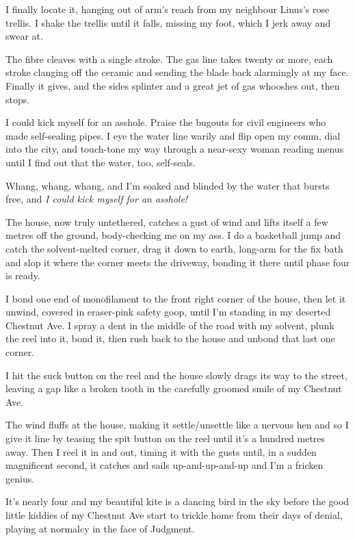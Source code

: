 I finally locate it, hanging out of arm's reach from my neighbour
Linus's rose trellis. I shake the trellis until it falls, missing
my foot, which I jerk away and swear at.

\tb

The fibre cleaves with a single stroke. The gas line takes twenty
or more, each stroke clanging off the ceramic and sending the blade
back alarmingly at my face. Finally it gives, and the sides
splinter and a great jet of gas whooshes out, then stops.

I could kick myself for an asshole. Praise the bugouts for civil
engineers who made self-sealing pipes. I eye the water line warily
and flip open my comm, dial into the city, and touch-tone my way
through a near-sexy woman reading menus until I find out that the
water, too, self-seals.

Whang, whang, whang, and I'm soaked and blinded by the water that
bursts free, and \emph{I could kick myself for an asshole!}

The house, now truly untethered, catches a gust of wind and lifts
itself a few metres off the ground, body-checking me on my ass. I
do a basketball jump and catch the solvent-melted corner, drag it
down to earth, long-arm for the fix bath and slop it where the
corner meets the driveway, bonding it there until phase four is
ready.

\tb

I bond one end of monofilament to the front right corner of the
house, then let it unwind, covered in eraser-pink safety goop,
until I'm standing in my deserted Chestnut Ave. I spray a dent in
the middle of the road with my solvent, plunk the reel into it,
bond it, then rush back to the house and unbond that last one
corner.

I hit the suck button on the reel and the house slowly drags its
way to the street, leaving a gap like a broken tooth in the
carefully groomed smile of my Chestnut Ave.

The wind fluffs at the house, making it settle/unsettle like a
nervous hen and so I give it line by teasing the spit button on the
reel until it's a hundred metres away. Then I reel it in and out,
timing it with the gusts until, in a sudden magnificent second, it
catches and sails up-and-up-and-up and I'm a fricken genius.

\tb

It's nearly four and my beautiful kite is a dancing bird in the sky
before the good little kiddies of my Chestnut Ave start to trickle
home from their days of denial, playing at normalcy in the face of
Judgment.

